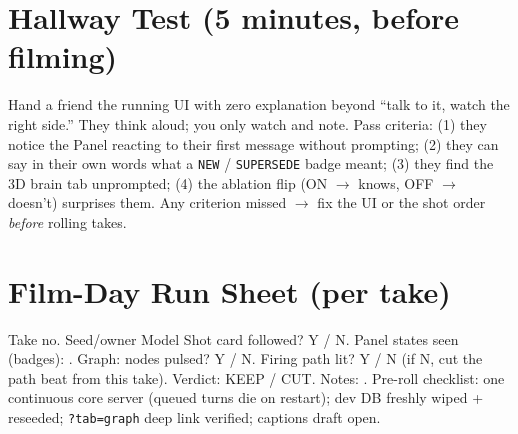\section{Hallway Test (5 minutes, before filming)}
Hand a friend the running UI with zero explanation beyond ``talk to it, watch the right side.''
They think aloud; you only watch and note. Pass criteria: (1) they notice the Panel reacting to
their first message without prompting; (2) they can say in their own words what a
\texttt{NEW} / \texttt{SUPERSEDE} badge meant; (3) they find the 3D brain tab unprompted;
(4) the ablation flip (ON $\rightarrow$ knows, OFF $\rightarrow$ doesn't) surprises them.
Any criterion missed $\rightarrow$ fix the UI or the shot order \emph{before} rolling takes.

\section{Film-Day Run Sheet (per take)}
Take no. \underline{\hspace{1.5cm}} Seed/owner \underline{\hspace{2.5cm}} Model
\underline{\hspace{3cm}} Shot card followed? Y / N. Panel states seen (badges):
\underline{\hspace{4cm}}. Graph: nodes pulsed? Y / N. Firing path lit? Y / N (if N, cut the
path beat from this take). Verdict: KEEP / CUT. Notes: \underline{\hspace{6cm}}.
Pre-roll checklist: one continuous core server (queued turns die on restart); dev DB freshly
wiped + reseeded; \texttt{?tab=graph} deep link verified; captions draft open.
